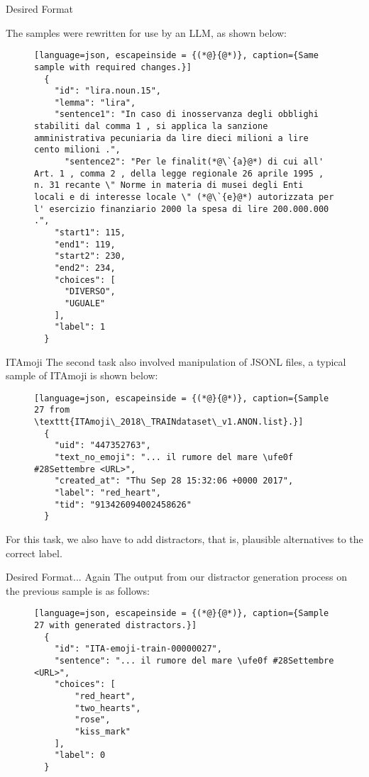 \documentclass[english, xcolor={table,usenames}]{beamer}
\begin{document}
\begin{frame}[fragile]{Desired Format}

  The samples were rewritten for use by an LLM, as shown below:


  \begin{figure}[H]
    \centering
    \begin{lstlisting}[language=json, escapeinside = {(*@}{@*)}, caption={Same sample with required changes.}]
  {
    "id": "lira.noun.15",
    "lemma": "lira",
    "sentence1": "In caso di inosservanza degli obblighi stabiliti dal comma 1 , si applica la sanzione amministrativa pecuniaria da lire dieci milioni a lire cento milioni .",
      "sentence2": "Per le finalit(*@\`{a}@*) di cui all' Art. 1 , comma 2 , della legge regionale 26 aprile 1995 , n. 31 recante \" Norme in materia di musei degli Enti locali e di interesse locale \" (*@\`{e}@*) autorizzata per l' esercizio finanziario 2000 la spesa di lire 200.000.000 .",
    "start1": 115,
    "end1": 119,
    "start2": 230,
    "end2": 234,
    "choices": [
      "DIVERSO",
      "UGUALE"
    ],
    "label": 1
  }
\end{lstlisting}
  \end{figure}
\end{frame}

\begin{frame}[fragile]{ITAmoji}
  The second task also involved manipulation of JSONL files, a typical sample of ITAmoji is shown below:

  \begin{figure}[H]
    \centering
    \begin{lstlisting}[language=json, escapeinside = {(*@}{@*)}, caption={Sample 27 from \texttt{ITAmoji\_2018\_TRAINdataset\_v1.ANON.list}.}]
  {
    "uid": "447352763",
    "text_no_emoji": "... il rumore del mare \ufe0f #28Settembre <URL>",
    "created_at": "Thu Sep 28 15:32:06 +0000 2017",
    "label": "red_heart",
    "tid": "913426094002458626"
  }
  \end{lstlisting}
  \end{figure}

  For this task, we also have to add \alert{distractors}, that is, plausible alternatives to the correct label.

\end{frame}


\begin{frame}[fragile]{Desired Format... Again}
  The output from our distractor generation process on the previous sample is as follows:

  \begin{figure}[H]
    \centering
    \begin{lstlisting}[language=json, escapeinside = {(*@}{@*)}, caption={Sample 27 with generated distractors.}]
  {
    "id": "ITA-emoji-train-00000027",
    "sentence": "... il rumore del mare \ufe0f #28Settembre <URL>",
    "choices": [
        "red_heart",
        "two_hearts",
        "rose",
        "kiss_mark"
    ],
    "label": 0
  }
  \end{lstlisting}
  \end{figure}
\end{frame}
\end{document}
